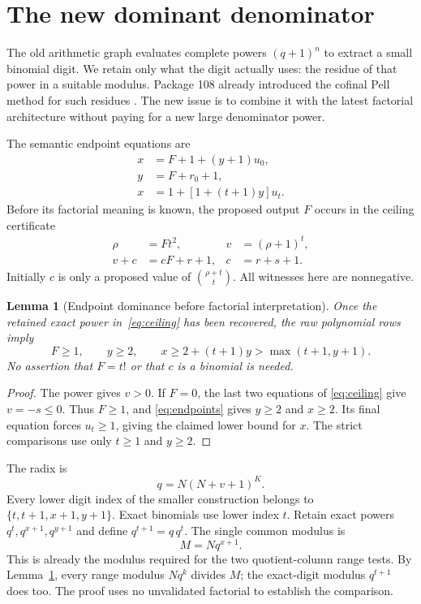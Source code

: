 \documentclass[11pt,letterpaper]{article}
\newtheorem{lemma}[theorem]{Lemma}
\theoremstyle{remark}\newtheorem{remark}[theorem]{Remark}
\begin{document}
\section{The new dominant denominator}
\label{sec:dominant}

The old arithmetic graph evaluates complete powers \((q+1)^n\) to
extract a small binomial digit. We retain only what the digit actually
uses: the residue of that power in a suitable modulus. Package 108
already introduced the cofinal Pell method for such residues
\cite{modular108}. The new issue is to combine it with the latest
factorial architecture without paying for a new large denominator power.

The semantic endpoint equations are
\begin{align}
 x&=F+1+(y+1)u_0,\nonumber\\
 y&=F+r_0+1,\label{eq:endpoints}\\
 x&=1+[1+(t+1)y]u_t.\nonumber
\end{align}
Before its factorial meaning is known, the proposed output \(F\) occurs
in the ceiling certificate
\begin{align}
 \rho&=Ft^2,& v&=(\rho+1)^t,\nonumber\\
 v+c&=cF+r+1,&c&=r+s+1. \label{eq:ceiling}
\end{align}
Initially \(c\) is only a proposed value of
\(\binom{\rho+t}{t}\). All witnesses here are nonnegative.

\begin{lemma}[Endpoint dominance before factorial interpretation]
\label{lem:dominant}
Once the retained exact power in~\eqref{eq:ceiling} has been recovered,
the raw polynomial rows imply
\[
 F\ge1,\qquad y\ge2,\qquad
 x\ge2+(t+1)y>\max(t+1,y+1).
\]
No assertion that \(F=t!\) or that \(c\) is a binomial is needed.
\end{lemma}
\begin{proof}
The power gives \(v>0\). If \(F=0\), the last two equations of
\eqref{eq:ceiling} give \(v=-s\le0\). Thus \(F\ge1\), and
\eqref{eq:endpoints} gives \(y\ge2\) and \(x\ge2\). Its final
equation forces \(u_t\ge1\), giving the claimed lower bound for \(x\).
The strict comparisons use only \(t\ge1\) and \(y\ge2\).
\end{proof}

The radix is
\begin{equation}
 q=N(N+v+1)^K. \label{eq:radix}
\end{equation}
Every lower digit index of the smaller construction belongs to
\(\{t,t+1,x+1,y+1\}\). Exact binomials use lower index \(t\).
Retain exact powers \(q^t,q^{x+1},q^{y+1}\) and define
\(q^{t+1}=q\,q^t\). The single common modulus is
\begin{equation}
 \boxed{M=Nq^{x+1}.} \label{eq:dominantmod}
\end{equation}
This is already the modulus required for the two quotient-column range
tests. By Lemma~\ref{lem:dominant}, every range modulus \(Nq^k\)
divides \(M\); the exact-digit modulus \(q^{t+1}\) does too.
The proof uses no unvalidated factorial to establish the comparison.
\end{document}
